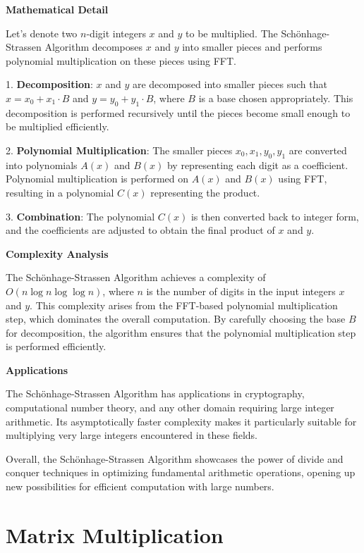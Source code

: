 \documentclass[12pt]{book} %
\begin{document}
\textbf{Mathematical Detail}

Let's denote two \(n\)-digit integers \(x\) and \(y\) to be multiplied. The Schönhage-Strassen Algorithm decomposes \(x\) and \(y\) into smaller pieces and performs polynomial multiplication on these pieces using FFT.

1. \textbf{Decomposition}: \(x\) and \(y\) are decomposed into smaller pieces such that \(x = x_0 + x_1 \cdot B\) and \(y = y_0 + y_1 \cdot B\), where \(B\) is a base chosen appropriately. This decomposition is performed recursively until the pieces become small enough to be multiplied efficiently.

2. \textbf{Polynomial Multiplication}: The smaller pieces \(x_0, x_1, y_0, y_1\) are converted into polynomials \(A(x)\) and \(B(x)\) by representing each digit as a coefficient. Polynomial multiplication is performed on \(A(x)\) and \(B(x)\) using FFT, resulting in a polynomial \(C(x)\) representing the product.

3. \textbf{Combination}: The polynomial \(C(x)\) is then converted back to integer form, and the coefficients are adjusted to obtain the final product of \(x\) and \(y\).

\textbf{Complexity Analysis}

The Schönhage-Strassen Algorithm achieves a complexity of \(O(n \log n \log \log n)\), where \(n\) is the number of digits in the input integers \(x\) and \(y\). This complexity arises from the FFT-based polynomial multiplication step, which dominates the overall computation. By carefully choosing the base \(B\) for decomposition, the algorithm ensures that the polynomial multiplication step is performed efficiently.

\textbf{Applications}

The Schönhage-Strassen Algorithm has applications in cryptography, computational number theory, and any other domain requiring large integer arithmetic. Its asymptotically faster complexity makes it particularly suitable for multiplying very large integers encountered in these fields.

Overall, the Schönhage-Strassen Algorithm showcases the power of divide and conquer techniques in optimizing fundamental arithmetic operations, opening up new possibilities for efficient computation with large numbers.

\section{Matrix Multiplication}
\end{document}
